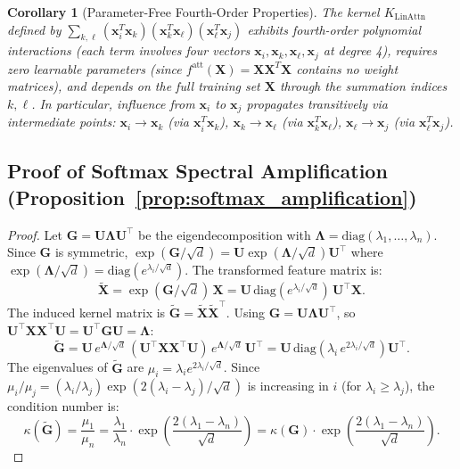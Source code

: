 \documentclass{article}
\theoremstyle{plain}
\newtheorem{corollary}[theorem]{Corollary}
\theoremstyle{definition}
\theoremstyle{remark}
\begin{document}
\begin{corollary}[Parameter-Free Fourth-Order Properties]
The kernel $K_{\text{LinAttn}}$ defined by $\sum_{k,\ell} (\mathbf{x}_i^T \mathbf{x}_k)(\mathbf{x}_k^T \mathbf{x}_\ell)(\mathbf{x}_\ell^T \mathbf{x}_j)$ exhibits fourth-order polynomial interactions (each term involves four vectors $\mathbf{x}_i, \mathbf{x}_k, \mathbf{x}_\ell, \mathbf{x}_j$ at degree 4), requires zero learnable parameters (since $f^{\text{att}}(\mathbf{X}) = \mathbf{X}\mathbf{X}^T\mathbf{X}$ contains no weight matrices), and depends on the full training set $\mathbf{X}$ through the summation indices $k, \ell$. In particular, influence from $\mathbf{x}_i$ to $\mathbf{x}_j$ propagates transitively via intermediate points: $\mathbf{x}_i \to \mathbf{x}_k$ (via $\mathbf{x}_i^T \mathbf{x}_k$), $\mathbf{x}_k \to \mathbf{x}_\ell$ (via $\mathbf{x}_k^T \mathbf{x}_\ell$), $\mathbf{x}_\ell \to \mathbf{x}_j$ (via $\mathbf{x}_\ell^T \mathbf{x}_j$).
\end{corollary}

\subsection{Proof of Softmax Spectral Amplification (Proposition~\ref{prop:softmax_amplification})}

\begin{proof}
Let $\mathbf{G} = \mathbf{U}\boldsymbol{\Lambda}\mathbf{U}^\top$ be the eigendecomposition with $\boldsymbol{\Lambda} = \mathrm{diag}(\lambda_1,\ldots,\lambda_n)$. Since $\mathbf{G}$ is symmetric, $\exp(\mathbf{G}/\sqrt{d}) = \mathbf{U}\exp(\boldsymbol{\Lambda}/\sqrt{d})\mathbf{U}^\top$ where $\exp(\boldsymbol{\Lambda}/\sqrt{d}) = \mathrm{diag}(e^{\lambda_i/\sqrt{d}})$. The transformed feature matrix is:
$$\tilde{\mathbf{X}} = \exp(\mathbf{G}/\sqrt{d})\,\mathbf{X} = \mathbf{U}\,\mathrm{diag}(e^{\lambda_i/\sqrt{d}})\,\mathbf{U}^\top\mathbf{X}.$$
The induced kernel matrix is $\tilde{\mathbf{G}} = \tilde{\mathbf{X}}\tilde{\mathbf{X}}^\top$. Using $\mathbf{G} = \mathbf{U}\boldsymbol{\Lambda}\mathbf{U}^\top$, so $\mathbf{U}^\top\mathbf{X}\mathbf{X}^\top\mathbf{U} = \mathbf{U}^\top\mathbf{G}\mathbf{U} = \boldsymbol{\Lambda}$:
$$\tilde{\mathbf{G}} = \mathbf{U}\,e^{\boldsymbol{\Lambda}/\sqrt{d}}\,(\mathbf{U}^\top\mathbf{X}\mathbf{X}^\top\mathbf{U})\,e^{\boldsymbol{\Lambda}/\sqrt{d}}\,\mathbf{U}^\top = \mathbf{U}\,\mathrm{diag}\!\left(\lambda_i\,e^{2\lambda_i/\sqrt{d}}\right)\mathbf{U}^\top.$$
The eigenvalues of $\tilde{\mathbf{G}}$ are $\mu_i = \lambda_i e^{2\lambda_i/\sqrt{d}}$. Since $\mu_i/\mu_j = (\lambda_i/\lambda_j)\exp(2(\lambda_i-\lambda_j)/\sqrt{d})$ is increasing in $i$ (for $\lambda_i \geq \lambda_j$), the condition number is:
$$\kappa(\tilde{\mathbf{G}}) = \frac{\mu_1}{\mu_n} = \frac{\lambda_1}{\lambda_n}\cdot\exp\!\left(\frac{2(\lambda_1-\lambda_n)}{\sqrt{d}}\right) = \kappa(\mathbf{G})\cdot\exp\!\left(\frac{2(\lambda_1-\lambda_n)}{\sqrt{d}}\right).$$
\end{proof}
\end{document}
